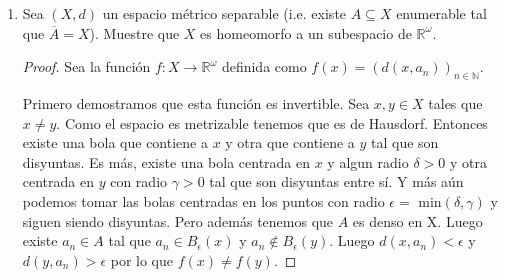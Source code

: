 \documentclass[letter,twoside,12pt]{article}
\begin{document}
\begin{enumerate}
\begin{proof}
En segundo lugar tómese un bola de radio $ \epsilon $ alrededor de $x$ y tómese cualquier $y \in B_\epsilon(x)$. Entonces vamos a demostrar que existe un abierto de la topología producto contenido en esta bola que contiene a $ y $. Por la propiedad arquimedeana siempre se puede encontrar un $ N \in \mathbb{N} $ tal que $ \epsilon*N>1 $, es decir tal que $ 1/N<\epsilon $. Para todos los $ i \geq N $ y para todo $ y_i \in X_i $ se cumple que $ \overline{d}_i(x_i,y_i)/i \leq 1/i < \epsilon$. Para los $ i < N $ tomemos la bola de radio $ \epsilon_i $ alrededor de $ y_i $, donde $ \epsilon_i<\epsilon-\overline{d_i}(x_i,y_i)\})$. Sea $ B = \prod_{i \in \mathbb{N}} V_i $ donde $ V_i = B_{\epsilon_i}(y_i)$ para los $ i < N $ y $ V_i = X_n$ para $ i \geq N $. Claramente $y \in B$, ahora vamos a demostrar que $ B \subseteq B_{\epsilon}(x) $. Tomemos cualquier elemento $ b \in B $. Probemos que $ D(b,x)< \epsilon $. Obsérvese que para todo $ i \in \mathbb{N} $ tenemos que $ \overline{d_i}(x_i,b_i)/i < \epsilon$. Si $i\geq N$ esto es trivial porque $ \overline{d}_i(x,y)/i\leq 1/i \geq 1/N$. Si $ i<N $ entonces $\overline{d_i}(b_i,y_i)<\epsilon-d_i(x_i,y_i),d_i(x_i,y_i)$. Entonces por desigualdad triangular tenemos que $ \overline{d_i}(x_i,b_i)/i \leq \overline{d_i}(x_i,y_i)/i + \overline{d_i}(y_i,b_i)/i < \overline{d_i}(x_i,y_i)/i + \epsilon - \overline{d_i}(x_i,y_i)i=\epsilon$.  Como solamente se consideran finitos de estos (hasta la coordenada $ n-1 $) puedo tomar 
\begin{equation}
M= \text{max}\Big(\Big\{\frac{\overline{d_1}(b_1,y_1)}{1}, \cdots, \frac{\overline{d_{n-1}}(b_1,y_{n-1})}{n-1},\frac{1}{n}\Big\}\Big)\nonumber
\end{equation}

Entonces $ D(b,x) \leq M < \epsilon$. Concluimos que $ b \in B_\epsilon(x) $.

\end{proof}

\item Sea $ (X,d) $ un espacio métrico separable (i.e. existe $ A \subseteq X $ enumerable tal que $ \overline{A}= X $). Muestre que $ X $ es homeomorfo a un subespacio de $ \mathbb{R}^{\omega} $.
\begin{proof}

Sea la función $ f: X \to \mathbb{R}^{\omega} $ definida como $ f(x) = (d(x,a_n))_{n \in \mathbb{N}} $.

Primero demostramos que esta función es invertible. Sea $ x,y  \in X$ tales que $ x \not = y $. Como el espacio es metrizable tenemos que es de Hausdorf. Entonces existe una bola que contiene a $x$ y otra que contiene a $y$ tal que son disyuntas. Es más, existe una bola centrada en $x$ y algun radio $ \delta >0 $ y otra centrada en $y$ con radio $ \gamma> 0 $ tal que son disyuntas entre sí. Y más aún podemos tomar las bolas centradas en los puntos con radio $\epsilon =$ min$(\delta,\gamma)$ y siguen siendo disyuntas. Pero además tenemos que $A$ es denso en X. Luego existe $a_n \in A$ tal que $ a_n \in B_\epsilon(x) $ y $ a_n \not \in B_\epsilon(y) $. Luego $ d(x,a_n)<\epsilon $ y $ d(y,a_n)>\epsilon $ por lo que $ f(x) \not = f(y)$.   


\end{proof}
\end{enumerate}
\end{document}
